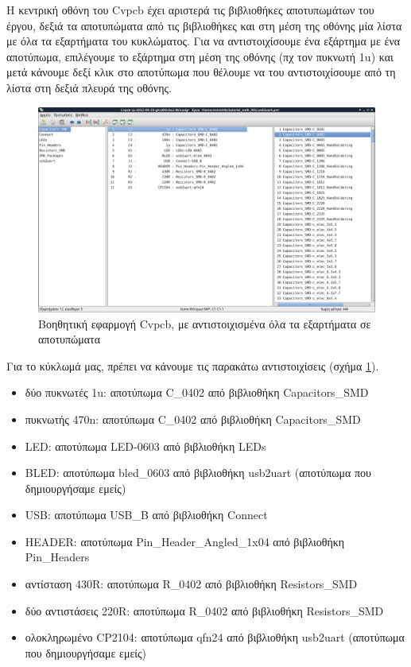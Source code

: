 \documentclass[a4paper]{article}
\begin{document}
Η κεντρική οθόνη του \textenglish{Cvpcb} έχει αριστερά τις βιβλιοθήκες αποτυπωμάτων του έργου, δεξιά τα αποτυπώματα από τις βιβλιοθήκες και στη μέση της οθόνης μία λίστα με όλα τα εξαρτήματα του κυκλώματος. Για να αντιστοιχίσουμε ένα εξάρτημα με ένα αποτύπωμα, επιλέγουμε το εξάρτημα στη μέση της οθόνης (πχ τον πυκνωτή 1u) και μετά κάνουμε δεξί κλικ στο αποτύπωμα που θέλουμε να του αντιστοιχίσουμε από τη λίστα στη δεξιά πλευρά της οθόνης.

\begin{figure}
  \begin{center}
    \includegraphics[width=.9\textwidth]{img/cvpcb-wind-main.png}
    \caption{Βοηθητική εφαρμογή \textenglish{Cvpcb}, με αντιστοιχισμένα όλα τα εξαρτήματα σε αποτυπώματα}
    \label{fig:cvpcb-wind-main}
  \end{center}
\end{figure}

Για το κύκλωμά μας, πρέπει να κάνουμε τις παρακάτω αντιστοιχίσεις (σχήμα \ref{fig:cvpcb-wind-main}).

\begin{itemize}
    \item δύο πυκνωτές 1u: αποτύπωμα C\_0402 από βιβλιοθήκη Capacitors\_SMD 
    \item πυκνωτής 470n: αποτύπωμα C\_0402 από βιβλιοθήκη Capacitors\_SMD
    \item LED: αποτύπωμα LED-0603 από βιβλιοθήκη LEDs
    \item BLED: αποτύπωμα bled\_0603 από βιβλιοθήκη usb2uart (αποτύπωμα που δημιουργήσαμε εμείς)
    \item USB: αποτύπωμα USB\_B από βιβλιοθήκη Connect
    \item HEADER: αποτύπωμα Pin\_Header\_Angled\_1x04 από βιβλιοθήκη Pin\_Headers
    \item αντίσταση 430R: αποτύπωμα R\_0402 από βιβλιοθήκη Resistors\_SMD 
    \item δύο αντιστάσεις 220R: αποτύπωμα R\_0402 από βιβλιοθήκη Resistors\_SMD 
    \item ολοκληρωμένο CP2104: αποτύπωμα qfn24 από βιβλιοθήκη usb2uart (αποτύπωμα που δημιουργήσαμε εμείς)
\end{itemize}
\end{document}
